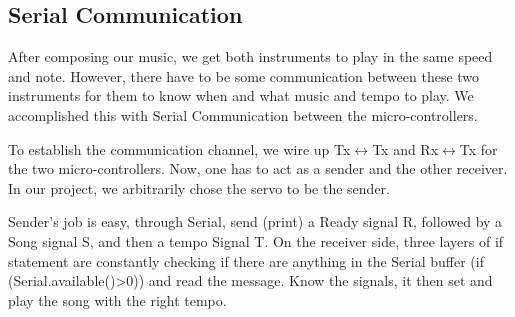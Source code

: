 \documentclass[a0,landscape]{a0poster}
\begin{document}
\begin{multicols}{4}

\section*{Serial Communication}
After composing our music, we get both instruments to play in the same speed and note. However, there have to be some communication between these two instruments for them to know when and what music and tempo to play. We accomplished this with Serial Communication between the micro-controllers. \par
To establish the communication channel, we wire up Tx$\leftrightarrow$Tx and Rx$\leftrightarrow$Tx for the two micro-controllers. Now, one has to act as a sender and the other receiver. In our project, we arbitrarily chose the servo to be the sender.\par
Sender's job is easy, through Serial, send (print) a Ready signal R, followed by a Song signal S, and then a tempo Signal T. On the receiver side, three layers of if statement are constantly checking if there are anything in the Serial buffer (if (Serial.available()>0)) and read the message. Know the signals, it then set and play the song with the right tempo. 



\end{multicols}
\end{document}
